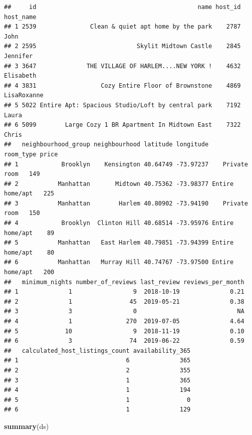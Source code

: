 \documentclass[
]{article}
\newenvironment{Shaded}{\begin{snugshade}}{\end{snugshade}}
\newcommand{\KeywordTok}[1]{\textcolor[rgb]{0.13,0.29,0.53}{\textbf{#1}}}
\newcommand{\NormalTok}[1]{#1}
\begin{document}
\begin{verbatim}
##     id                                             name host_id   host_name
## 1 2539               Clean & quiet apt home by the park    2787        John
## 2 2595                            Skylit Midtown Castle    2845    Jennifer
## 3 3647              THE VILLAGE OF HARLEM....NEW YORK !    4632   Elisabeth
## 4 3831                  Cozy Entire Floor of Brownstone    4869 LisaRoxanne
## 5 5022 Entire Apt: Spacious Studio/Loft by central park    7192       Laura
## 6 5099        Large Cozy 1 BR Apartment In Midtown East    7322       Chris
##   neighbourhood_group neighbourhood latitude longitude       room_type price
## 1            Brooklyn    Kensington 40.64749 -73.97237    Private room   149
## 2           Manhattan       Midtown 40.75362 -73.98377 Entire home/apt   225
## 3           Manhattan        Harlem 40.80902 -73.94190    Private room   150
## 4            Brooklyn  Clinton Hill 40.68514 -73.95976 Entire home/apt    89
## 5           Manhattan   East Harlem 40.79851 -73.94399 Entire home/apt    80
## 6           Manhattan   Murray Hill 40.74767 -73.97500 Entire home/apt   200
##   minimum_nights number_of_reviews last_review reviews_per_month
## 1              1                 9  2018-10-19              0.21
## 2              1                45  2019-05-21              0.38
## 3              3                 0                            NA
## 4              1               270  2019-07-05              4.64
## 5             10                 9  2018-11-19              0.10
## 6              3                74  2019-06-22              0.59
##   calculated_host_listings_count availability_365
## 1                              6              365
## 2                              2              355
## 3                              1              365
## 4                              1              194
## 5                              1                0
## 6                              1              129
\end{verbatim}

\begin{Shaded}
\begin{Highlighting}[]
\KeywordTok{summary}\NormalTok{(ds)}
\end{Highlighting}
\end{Shaded}
\end{document}
